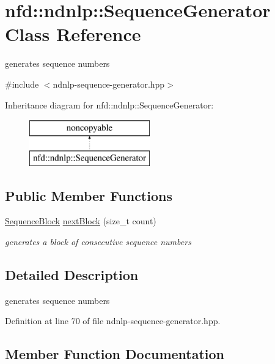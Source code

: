 \hypertarget{classnfd_1_1ndnlp_1_1SequenceGenerator}{}\section{nfd\+:\+:ndnlp\+:\+:Sequence\+Generator Class Reference}
\label{classnfd_1_1ndnlp_1_1SequenceGenerator}


generates sequence numbers  




{\ttfamily \#include $<$ndnlp-\/sequence-\/generator.\+hpp$>$}

Inheritance diagram for nfd\+:\+:ndnlp\+:\+:Sequence\+Generator\+:\begin{figure}[H]
\begin{center}
\leavevmode
\includegraphics[height=2.000000cm]{classnfd_1_1ndnlp_1_1SequenceGenerator}
\end{center}
\end{figure}
\subsection*{Public Member Functions}
\begin{DoxyCompactItemize}
\item 
\hyperlink{classnfd_1_1ndnlp_1_1SequenceBlock}{Sequence\+Block} \hyperlink{classnfd_1_1ndnlp_1_1SequenceGenerator_ab111ea42c6ecb2213b71676daf2c7550}{next\+Block} (size\+\_\+t count)
\begin{DoxyCompactList}\small\item\em generates a block of consecutive sequence numbers \end{DoxyCompactList}\end{DoxyCompactItemize}


\subsection{Detailed Description}
generates sequence numbers 

Definition at line 70 of file ndnlp-\/sequence-\/generator.\+hpp.



\subsection{Member Function Documentation}
